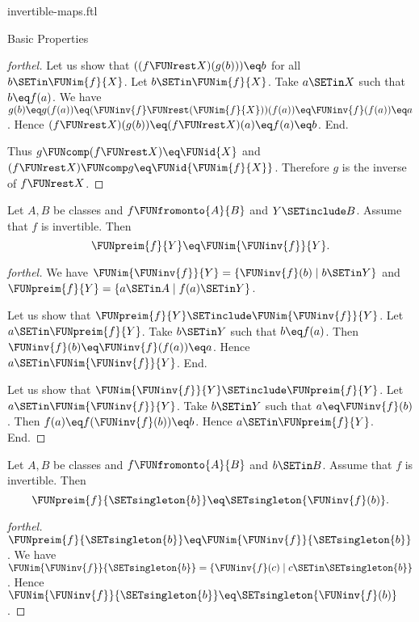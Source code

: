 \documentclass{naproche-library}
\begin{document}
\begin{smodule}[title=Invertible Maps]{invertible-maps.ftl}
\begin{sfragment}{Basic Properties}
\begin{proof}[forthel]
    Let us show that $((f \FUNrest X)(g(b))) \eq b$ for all $b \SETin \FUNim{f}{X}$.
      Let $b \SETin \FUNim{f}{X}$.
      Take $a \SETin X$ such that $b \eq f(a)$.
      We have $g(b)
        \eq g(f(a))
        \eq (\FUNinv{f} \FUNrest (\FUNim{f}{X}))(f(a))
        \eq \FUNinv{f}(f(a))
        \eq a$.
      Hence $(f \FUNrest X)(g(b))
        \eq (f \FUNrest X)(a)
        \eq f(a)
        \eq b$.
    End.

    Thus $g \FUNcomp (f \FUNrest X) \eq \FUNid{X}$ and $(f \FUNrest X) \FUNcomp g \eq \FUNid{\FUNim{f}{X}}$.
    Therefore $g$ is the inverse of $f \FUNrest X$.
  \end{proof}

  \begin{proposition}[forthel,id=FOUNDATIONS_09_7726021377785856]
    Let $A, B$ be classes and $f \FUNfromonto{A}{B}$ and $Y \SETinclude B$.
    Assume that $f$ is invertible.
    Then \[ \FUNpreim{f}{Y} \eq \FUNim{\FUNinv{f}}{Y}. \]
  \end{proposition}
  \begin{proof}[forthel]
    We have $\FUNim{\FUNinv{f}}{Y} = \{ \FUNinv{f}(b) \mid b \SETin Y \}$ and $\FUNpreim{f}{Y} = \{ a \SETin A \mid f(a) \SETin Y \}$.

    Let us show that $\FUNpreim{f}{Y} \SETinclude \FUNim{\FUNinv{f}}{Y}$.
      Let $a \SETin \FUNpreim{f}{Y}$.
      Take $b \SETin Y$ such that $b \eq f(a)$.
      Then $\FUNinv{f}(b) \eq \FUNinv{f}(f(a)) \eq a$.
      Hence $a \SETin \FUNim{\FUNinv{f}}{Y}$.
    End.

    Let us show that $\FUNim{\FUNinv{f}}{Y} \SETinclude \FUNpreim{f}{Y}$.
      Let $a \SETin \FUNim{\FUNinv{f}}{Y}$.
      Take $b \SETin Y$ such that $a \eq \FUNinv{f}(b)$.
      Then $f(a) \eq f(\FUNinv{f}(b)) \eq b$.
      Hence $a \SETin \FUNpreim{f}{Y}$.
    End.
  \end{proof}

  \begin{corollary}[forthel,id=FOUNDATIONS_09_8607784268464128]
    Let $A, B$ be classes and $f \FUNfromonto{A}{B}$ and $b \SETin B$.
    Assume that $f$ is invertible.
    Then \[ \FUNpreim{f}{\SETsingleton{b}} \eq \SETsingleton{\FUNinv{f}(b)}. \]
  \end{corollary}
  \begin{proof}[forthel]
    $\FUNpreim{f}{\SETsingleton{b}} \eq \FUNim{\FUNinv{f}}{\SETsingleton{b}}$.
    We have $\FUNim{\FUNinv{f}}{\SETsingleton{b}} = \{ \FUNinv{f}(c) \mid c \SETin \SETsingleton{b} \}$.
    Hence $\FUNim{\FUNinv{f}}{\SETsingleton{b}} \eq \SETsingleton{\FUNinv{f}(b)}$.
  \end{proof}


\end{sfragment}
\end{smodule}
\end{document}

